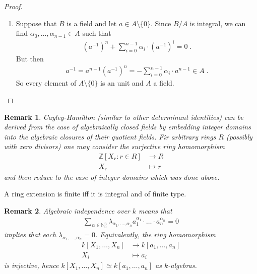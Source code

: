 \documentclass[DIV=14,parskip=full,pointednumbers]{scrartcl}
\newenvironment{rmnumerate}{\begin{enumerate}[label={\upshape(\roman*)},ref=\curthm]}{\end{enumerate}}
\theoremstyle{cthm}
\theoremstyle{cvarthm}
\theoremstyle{cdef}
\newtheorem{rem}{Remark}[subsection]
\newcommand{\IN}{\mathbb{N}}
\newcommand{\IZ}{\mathbb{Z}}
\newcommand{\longto}{\longrightarrow}
\newcommand{\ldotspam}{,\ldots,}
\begin{document}
\begin{proof}
\begin{rmnumerate}
			\item Suppose that $B$ is a field and let $a\in A \setminus\{0\}$. Since $B/A$ is integral, we can find $\alpha_0\ldotspam \alpha_{n-1}\in A$ such that 
			\begin{align*}
			\left(a^{-1}\right)^n+\sum_{i=0}^{n-1}\alpha_i\cdot\left(a^{-1}\right)^i = 0\;.
			\end{align*}
			But then 
			\begin{align*}
			a^{-1} = a^{n-1}\left(a^{-1}\right)^n = -\sum_{i=0}^{n-1} \alpha_i\cdot a^{n-1} \in A\;.
			\end{align*}
			So every element of $A\setminus\{0\}$ is an unit and $A$ a field.
		\end{rmnumerate}
		
		
	\end{proof}
	\begin{rem}
		Cayley-Hamilton (similar to other determinant identities) can be derived from the case of algebraically closed fields by embedding integer domains into the algebraic closures of their quotient fields. Fir arbitrary rings $R$ (possibly with zero divisors) one may consider the surjective ring homomorphism
		\begin{align*}
		\IZ[X_r: r\in R] &\longto R\\
		X_r &\longmapsto r
		\end{align*}
		and then reduce to the case of integer domains which was done above.
		
	\end{rem}
	
	\begin{cor}
		A ring extension is finite iff it is integral and of finite type.
	\end{cor}
	\begin{rem}
		Algebraic independence over $k$ means that
		\begin{align*}
		\sum_{\alpha\in \IN_0^n} \lambda_{\alpha_1\ldotspam \alpha_n} a_1^{\alpha_1}\cdot\ldots\cdot a_n^{\alpha_n}=0
		\end{align*}
		implies that each $\lambda_{\alpha_1\ldotspam \alpha_n}=0$. Equivalently, the ring homomorphism 
		\begin{align*}
		k[X_1,\ldots, X_n]&\longto k[a_1,\ldots, a_n]\\
		X_i&\longmapsto a_i
		\end{align*}
		is injective, hence $k[X_1,\ldots, X_n]\simeq k[a_1,\ldots, a_n]$ as $k$-algebras.
	\end{rem}
	
\end{document}
